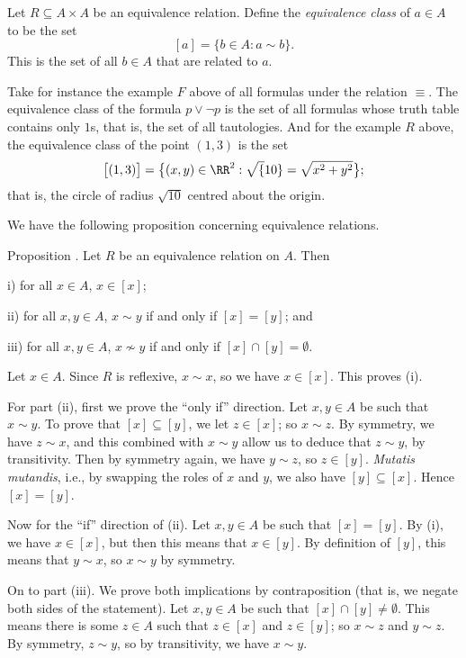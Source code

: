 Let $R\subseteq A\times A$ be an equivalence relation. Define the {\it equivalence class} of $a\in A$
to be the set
$$[a] = \{b\in A : a\sim b\}.$$
This is the set of all $b\in A$ that are related to $a$.

Take for instance the example $F$ above of all formulas under the relation $\equiv$. The equivalence class
of the formula $p\vee\neg p$ is the set of all formulas whose truth table contains only $1$s, that is,
the set of all tautologies.
And for the example $R$ above, the
equivalence class of the point $(1,3)$ is the set
$$\bigl[ (1,3)\bigr] = \bigl\{ (x,y)\in \RR^2 : \sqrt\{10\} = \sqrt{x^2 + y^2}\bigr\};$$
that is, the circle of radius $\sqrt{10}$ centred about the origin.

We have the following proposition concerning equivalence relations.

\proclaim Proposition \advthm. Let $R$ be an equivalence relation on $A$. Then
\medskip
\item{i)} for all $x\in A$, $x\in [x]$;
\smallskip
\item{ii)} for all $x,y\in A$, $x\sim y$ if and only if $[x] = [y]$; and
\smallskip
\item{iii)} for all $x,y\in A$, $x\not\sim y$ if and only if $[x] \cap [y] =  \emptyset$.
\medskip

\proof Let $x\in A$. Since $R$ is reflexive, $x\sim x$, so we have $x\in [x]$. This proves (i).

For part (ii), first we prove the ``only if'' direction. Let $x,y\in A$ be such that $x\sim y$. To prove that
$[x]\subseteq [y]$, we let $z\in [x]$; so $x\sim z$. By symmetry, we have $z\sim x$, and this
combined with $x\sim y$ allow us to deduce that $z\sim y$, by transitivity. Then by symmetry again,
we have $y\sim z$, so $z\in [y]$. {\it Mutatis mutandis}, i.e., by swapping the roles of $x$ and $y$,
we also have $[y]\subseteq [x]$. Hence $[x] = [y]$.

Now for the ``if'' direction of (ii). Let $x,y\in A$ be such that
$[x] = [y]$. By (i), we have $x\in [x]$, but
then this means that $x\in [y]$. By definition of $[y]$, this means that $y\sim x$, so $x\sim y$
by symmetry.

On to part (iii). We prove both implications by contraposition (that is, we negate both sides of the
statement). Let $x,y\in A$ be such that $[x]\cap [y] \ne \emptyset$. This means there is some $z\in A$ such
that $z\in [x]$ and $z\in [y]$; so $x\sim z$ and $y\sim z$. By symmetry, $z\sim y$,
so by transitivity, we have $x\sim y$.

